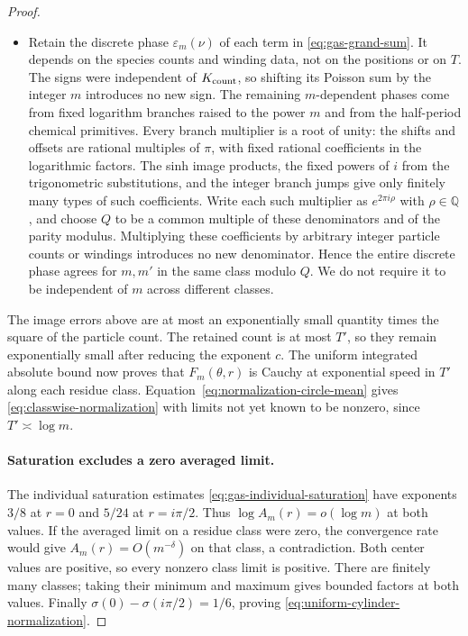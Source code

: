 \begin{proof}
\begin{itemize}
\item

Retain the discrete phase $\varepsilon_m(\nu)$ of each term in \eqref{eq:gas-grand-sum}. It depends on the species counts and winding data, not on the positions or on $T$. The signs were independent of $K_{\rm count}$, so shifting its Poisson sum by the integer $m$ introduces no new sign. The remaining $m$-dependent phases come from fixed logarithm branches raised to the power $m$ and from the half-period chemical primitives. Every branch multiplier is a root of unity: the shifts and offsets are rational multiples of $\pi$, with fixed rational coefficients in the logarithmic factors. The sinh image products, the fixed powers of $i$ from the trigonometric substitutions, and the integer branch jumps give only finitely many types of such coefficients. Write each such multiplier as $e^{2\pi i\rho}$ with $\rho\in\mathbb Q$, and choose $Q$ to be a common multiple of these denominators and of the parity modulus. Multiplying these coefficients by arbitrary integer particle counts or windings introduces no new denominator. Hence the entire discrete phase agrees for $m,m'$ in the same class modulo $Q$. We do not require it to be independent of $m$ across different classes.
\end{itemize}

The image errors above are at most an exponentially small quantity times the square of the particle count. The retained count is at most $T'$, so they remain exponentially small after reducing the exponent $c$. The uniform integrated absolute bound now proves that $F_m(\theta,r)$ is Cauchy at exponential speed in $T'$ along each residue class. Equation~\eqref{eq:normalization-circle-mean} gives \eqref{eq:classwise-normalization} with limits not yet known to be nonzero, since $T'\asymp\log m$.

\paragraph{Saturation excludes a zero averaged limit.}
The individual saturation estimates \eqref{eq:gas-individual-saturation} have exponents $3/8$ at $r=0$ and $5/24$ at $r=i\pi/2$. Thus $\log A_m(r)=o(\log m)$ at both values. If the averaged limit on a residue class were zero, the convergence rate would give $A_m(r)=O(m^{-\delta})$ on that class, a contradiction. Both center values are positive, so every nonzero class limit is positive. There are finitely many classes; taking their minimum and maximum gives bounded factors at both values. Finally $\sigma(0)-\sigma(i\pi/2)=1/6$, proving \eqref{eq:uniform-cylinder-normalization}.
\end{proof}


